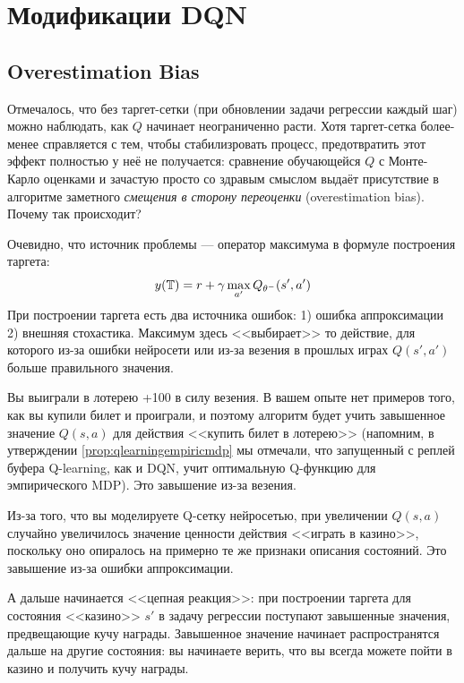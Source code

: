 \section{Модификации DQN}\label{sec:dqnmods}

\subsection{Overestimation Bias}\label{subsec:overestimation}

Отмечалось, что без таргет-сетки (при обновлении задачи регрессии каждый шаг) можно наблюдать, как $Q$ начинает неограниченно расти. Хотя таргет-сетка более-менее справляется с тем, чтобы стабилизровать процесс, предотвратить этот эффект полностью у неё не получается: сравнение обучающейся $Q$ с Монте-Карло оценками и зачастую просто со здравым смыслом выдаёт присутствие в алгоритме заметного \emph{смещения в сторону переоценки} (overestimation bias). Почему так происходит?

Очевидно, что источник проблемы --- оператор максимума в формуле построения таргета: 
$$y(\mathbb{T} ) = r + \gamma \max\limits_{a'} Q_{\theta^{-}}(s', a')$$
При построении таргета есть два источника ошибок: 1) ошибка аппроксимации 2) внешняя стохастика. Максимум здесь <<выбирает>> то действие, для которого из-за ошибки нейросети или из-за везения в прошлых играх $Q(s', a')$ больше правильного значения.

\begin{example}
Вы выиграли в лотерею +100 в силу везения. В вашем опыте нет примеров того, как вы купили билет и проиграли, и поэтому алгоритм будет учить завышенное значение $Q(s, a)$ для действия <<купить билет в лотерею>> (напомним, в утверждении \ref{prop:qlearningempiricmdp} мы отмечали, что запущенный с реплей буфера Q-learning, как и DQN, учит оптимальную Q-функцию для эмпирического MDP). Это завышение из-за везения.

Из-за того, что вы моделируете Q-сетку нейросетью, при увеличении $Q(s, a)$ случайно увеличилось значение ценности действия <<играть в казино>>, поскольку оно опиралось на примерно те же признаки описания состояний. Это завышение из-за ошибки аппроксимации.

А дальше начинается <<цепная реакция>>: при построении таргета для состояния <<казино>> $s'$ в задачу регрессии поступают завышенные значения, предвещающие кучу награды. Завышенное значение начинает распространятся дальше на другие состояния: вы начинаете верить, что вы всегда можете пойти в казино и получить кучу награды.
\end{example}

